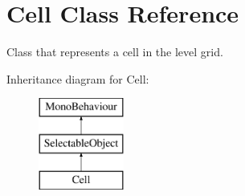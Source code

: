 \hypertarget{class_cell}{}\section{Cell Class Reference}
\label{class_cell}


Class that represents a cell in the level grid.  


Inheritance diagram for Cell\+:\begin{figure}[H]
\begin{center}
\leavevmode
\includegraphics[height=3.000000cm]{class_cell}
\end{center}
\end{figure}
